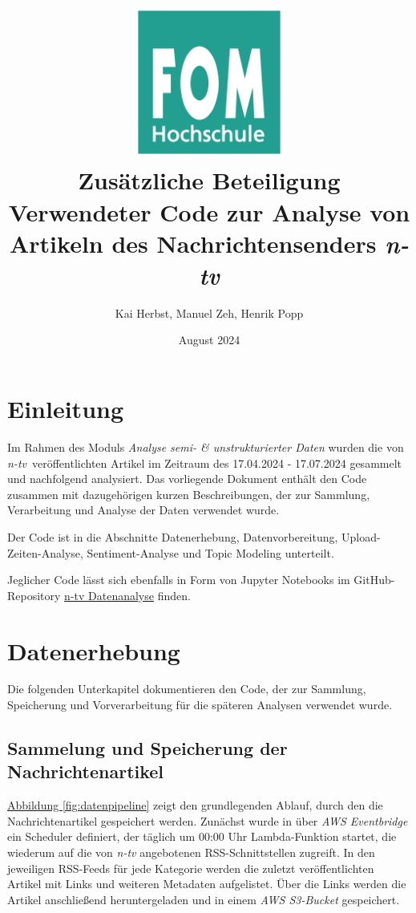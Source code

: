\documentclass[12pt]{article}
\title{%
    \includegraphics[width=5cm]{figures/logo.png}
    \\
    \vspace{1cm}
    \textbf{Zusätzliche Beteiligung}\\
    \bigskip
    \large Verwendeter Code zur Analyse von Artikeln des Nachrichtensenders \emph{n-tv}
}
\author{Kai Herbst, Manuel Zeh, Henrik Popp}
\date{August 2024}
\begin{document}
\begin{sloppypar}
	\maketitle
	\thispagestyle{empty}

	\newpage
	\setcounter{page}{1}

	\renewcommand{\contentsname}{Inhaltsverzeichnis}
	\tableofcontents

	\newpage
	\setcounter{page}{1}

	\section{Einleitung}

	Im Rahmen des Moduls \emph{Analyse semi- \& unstrukturierter Daten} wurden
	die von \emph{n-tv} veröffentlichten Artikel im Zeitraum des 17.04.2024 -
	17.07.2024 gesammelt und nachfolgend analysiert. Das vorliegende Dokument
	enthält den Code zusammen mit dazugehörigen kurzen Beschreibungen, der zur
	Sammlung, Verarbeitung und Analyse der Daten verwendet wurde.

	Der Code ist in die Abschnitte Datenerhebung, Datenvorbereitung,
	Upload-Zeiten-Analyse, Sentiment-Analyse und Topic Modeling unterteilt.

	Jeglicher Code lässt sich ebenfalls in Form von Jupyter Notebooks im
	GitHub-Repository
	\href{https://github.com/okaihe/SS2024-ASUD-Textanalyse/tree/main}{n-tv
		Datenanalyse} finden.


	\newpage
	\section{Datenerhebung}

	Die folgenden Unterkapitel dokumentieren den Code, der zur Sammlung,
	Speicherung und Vorverarbeitung für die späteren Analysen verwendet wurde.

	\subsection{Sammelung und Speicherung der Nachrichtenartikel}

	\hyperref[fig:datenpipeline]{Abbildung \ref{fig:datenpipeline}} zeigt den
	grundlegenden Ablauf, durch den die Nachrichtenartikel gespeichert werden.
	Zunächst wurde in über \emph{AWS Eventbridge} ein Scheduler definiert, der
	täglich um 00:00 Uhr Lambda-Funktion startet, die wiederum auf die von
	\emph{n-tv} angebotenen RSS-Schnittstellen zugreift. In den jeweiligen
	RSS-Feeds für jede Kategorie werden die zuletzt veröffentlichten Artikel
	mit Links und weiteren Metadaten aufgelistet. Über die Links werden die
	Artikel anschließend heruntergeladen und in einem \emph{AWS S3-Bucket}
	gespeichert.


\end{sloppypar}
\end{document}
